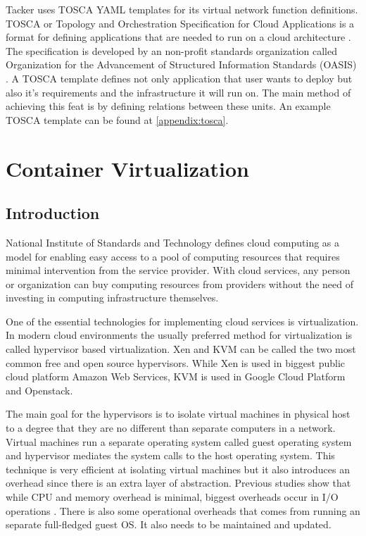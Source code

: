 \documentclass[12pt,oneandhalf,chaparabic,ceng,ms,eng,oneside,pntc]{gsufbe}
\begin{document}
Tacker uses TOSCA YAML templates for its virtual network function definitions.  TOSCA or Topology and
Orchestration Specification for Cloud Applications is a format for defining applications that are needed
to run on a cloud architecture \cite{oasis_tosca}.  The specification is developed by an non-profit
standards organization
called Organization for the Advancement of Structured Information Standards (OASIS) \cite{oasis}.
A TOSCA template defines not only application that user wants to deploy but also
it's requirements and the infrastructure it will run on.  The main method of achieving
this feat is by defining relations between these units.  An example TOSCA template can be found at
\ref{appendix:tosca}.


\chapter{Container Virtualization}
\section{Introduction}
National Institute of Standards and Technology defines cloud computing as a model for enabling
easy access to a pool of computing resources that requires minimal intervention from the service
provider.  With cloud services, any person or organization can buy computing resources from providers
without the need of investing in computing infrastructure themselves.  

One of the essential technologies for implementing cloud services is virtualization.  In modern cloud
environments the usually preferred method for virtualization is called hypervisor based virtualization.
Xen and KVM can be called the two most common free and open source hypervisors.  While Xen is used in
biggest public cloud platform Amazon Web Services, KVM is used in Google Cloud Platform and Openstack.

The main goal for the hypervisors is to isolate virtual machines in physical host to a degree that they
are no different than separate computers in a network.  Virtual machines run a separate operating system
called guest operating system and hypervisor mediates the system calls to the host operating system.
This technique is very efficient at isolating virtual machines but it also introduces an overhead
since there is an extra layer of abstraction.  Previous studies show that while CPU and memory overhead
is minimal, biggest overheads occur in I/O operations \cite{hwang_component_based_2013}.  There is also
some operational overheads that
comes from running an separate full-fledged guest OS.  It also needs to be maintained and updated.
\end{document}
